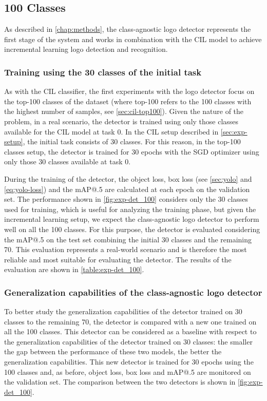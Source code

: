 \subsection{100 Classes}

As described in \autoref{chap:methods}, the class-agnostic logo detector represents the first stage of the system and works in combination with the CIL model to achieve incremental learning logo detection and recognition.

\subsubsection{Training using the 30 classes of the initial task}
As with the CIL classifier, the first experiments with the logo detector focus on the top-100 classes of the dataset (where top-100 refers to the 100 classes with the highest number of samples, see \autoref{sec:cil-top100}).
Given the nature of the problem, in a real scenario, the detector is trained using only those classes available for the CIL model at task 0.
In the CIL setup described in \autoref{sec:exp-setup}, the initial task consists of 30 classes.
For this reason, in the top-100 classes setup, the detector is trained for 30 epochs with the SGD optimizer using only those 30 classes available at task 0.

During the training of the detector, the object loss, box loss (see \autoref{sec:yolo} and \autoref{eq:yolo-loss}) and the mAP@.5 are calculated at each epoch on the validation set.
The performance shown in \autoref{fig:exp-det_100} considers only the 30 classes used for training, which is useful for analyzing the training phase, but given the incremental learning setup, we expect the class-agnostic logo detector to perform well on all the 100 classes.
For this purpose, the detector is evaluated considering the mAP@.5 on the test set combining the initial 30 classes and the remaining 70.
This evaluation represents a real-world scenario and is therefore the most reliable and most suitable for evaluating the detector.
The results of the evaluation are shown in \autoref{table:exp-det_100}.


\subsubsection{Generalization capabilities of the class-agnostic logo detector}
To better study the generalization capabilities of the detector trained on 30 classes to the remaining 70, the detector is compared with a new one trained on all the 100 classes.
This detector can be considered as a baseline with respect to the generalization capabilities of the detector trained on 30 classes: the smaller the gap between the performance of these two models, the better the generalization capabilities.
This new detector is trained for 30 epochs using the 100 classes and, as before, object loss, box loss and mAP@.5 are monitored on the validation set. The comparison between the two detectors is shown in \autoref{fig:exp-det_100}.


